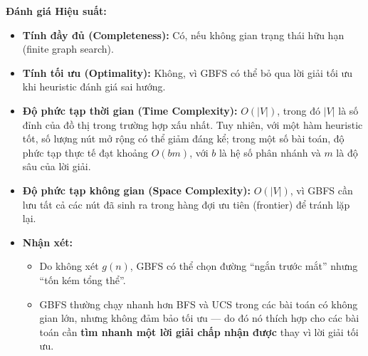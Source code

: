 \textbf{Đánh giá Hiệu suất:}
\begin{itemize}
    \item \textbf{Tính đầy đủ (Completeness):} Có, nếu không gian trạng thái hữu hạn (finite graph search).
    \item \textbf{Tính tối ưu (Optimality):} Không, vì GBFS có thể bỏ qua lời giải tối ưu khi heuristic đánh giá sai hướng.
    \item \textbf{Độ phức tạp thời gian (Time Complexity):} $O(|V|)$, 
    trong đó $|V|$ là số đỉnh của đồ thị trong trường hợp xấu nhất. Tuy nhiên, với một hàm heuristic tốt, 
    số lượng nút mở rộng có thể giảm đáng kể; trong một số bài toán, độ phức tạp thực tế đạt khoảng $O(bm)$, với $b$ là hệ số phân nhánh và $m$ là độ sâu của lời giải.
    \item \textbf{Độ phức tạp không gian (Space Complexity):}  $O(|V|)$, vì GBFS cần lưu tất cả các nút đã sinh ra trong hàng đợi ưu tiên (frontier) để tránh lặp lại.
    \item \textbf{Nhận xét:}
    \begin{itemize}
        \item Do không xét $g(n)$, GBFS có thể chọn đường “ngắn trước mắt” nhưng “tốn kém tổng thể”.
        \item GBFS thường chạy nhanh hơn BFS và UCS trong các bài toán có không gian lớn, nhưng không đảm bảo tối ưu — do đó nó thích hợp cho các bài toán cần \textbf{tìm nhanh một lời giải chấp nhận được} thay vì lời giải tối ưu.
    \end{itemize}
\end{itemize}